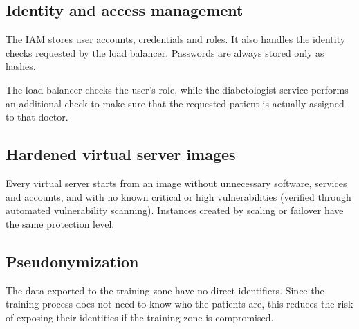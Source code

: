 \subsection{Identity and access management}


The IAM stores user accounts, credentials and roles. It also handles the
identity checks requested by the load balancer. Passwords are always stored only as hashes. 

The load balancer checks the user's role,
while the diabetologist service performs an additional check to make sure
that the requested patient is actually assigned to that doctor.



\subsection{Hardened virtual server images}


Every virtual server starts from an image without unnecessary software,
services and accounts, and with no known critical or high vulnerabilities
(verified through automated vulnerability scanning). Instances created by
scaling or failover have the same protection level.


\subsection{Pseudonymization}

The data exported to the training zone have no direct identifiers. Since the training process does not need to know who the patients
are, this reduces the risk of exposing their identities if the training zone
is compromised.